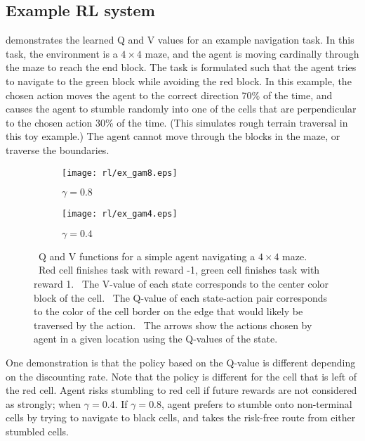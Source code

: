 \documentclass[../dissertation.tex]{subfiles}
\begin{document}
\subsection{Example RL system}

 demonstrates the learned Q and V values for an example navigation task.
In this task, the environment is a $4\times4$ maze, and the agent is moving cardinally through the maze to reach the end block.
The task is formulated such that the agent tries to navigate to the green block while avoiding the red block.
In this example, the chosen action moves the agent to the correct direction 70\% of the time, and causes the agent to stumble randomly into one of the cells that are perpendicular to the chosen action 30\% of the time.
(This simulates rough terrain traversal in this toy example.)
The agent cannot move through the blocks in the maze, or traverse the boundaries.

\begin{figure}[p]
    \centering
    \begin{subfigure}[b]{0.4\textwidth}
        \centering
        \texttt{[image: rl/ex\_gam8.eps]}
        \caption{$\gamma = 0.8$}
    \end{subfigure}
    \begin{subfigure}[b]{0.4\textwidth}
        \centering
        \texttt{[image: rl/ex\_gam4.eps]}
        \caption{$\gamma = 0.4$}
    \end{subfigure}
    \caption[Example navigation task]{\
        Q and V functions for a simple agent navigating a $4\times4$ maze. \
        Red cell finishes task with reward -1, green cell finishes task with reward 1. \
        The V-value of each state corresponds to the center color block of the cell. \
        The Q-value of each state-action pair corresponds to the color of the cell border on the edge that would likely be traversed by the action. \
        The arrows show the actions chosen by agent in a given location using the Q-values of the state.}
    \label{fig:exampleNavTask}
\end{figure}


One demonstration is that the policy based on the Q-value is different depending on the discounting rate.
Note that the policy is different for the cell that is left of the red cell.
Agent risks stumbling to red cell if future rewards are not considered as strongly; when $\gamma=0.4$.
If $\gamma=0.8$, agent prefers to stumble onto non-terminal cells by trying to navigate to black cells, and takes the risk-free route from either stumbled cells.
\end{document}
